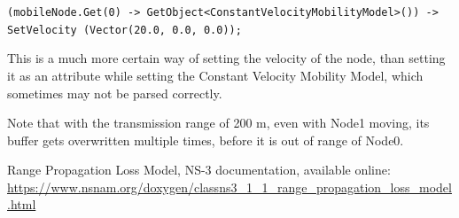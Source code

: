 \documentclass[11pt,journal]{article}
\begin{document}
	\texttt{(mobileNode.Get(0) -> GetObject<ConstantVelocityMobilityModel>()) -> SetVelocity (Vector(20.0, 0.0, 0.0));}
	
	This is a much more certain way of setting the velocity of the node, than setting it as an attribute while setting the Constant Velocity Mobility Model, which sometimes may not be parsed correctly.
	
		
	Note that with the transmission range of 200 m, even with Node1 moving, its buffer gets overwritten multiple times, before it is out of range of Node0.
	
	\begin{thebibliography}{1}
		Range Propagation Loss Model, NS-3 documentation, available online: \url{https://www.nsnam.org/doxygen/classns3_1_1_range_propagation_loss_model.html}
	\end{thebibliography}
\end{document}

